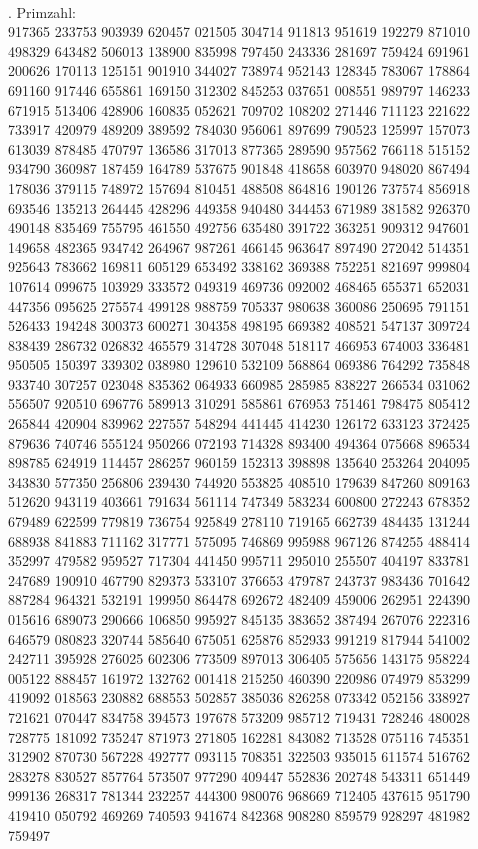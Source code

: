 \\
. Primzahl: \\
917365 233753 903939 620457 021505 304714 911813 951619 192279 871010 498329 643482 506013 138900 835998 797450 243336 281697 759424 691961 200626 170113 125151 901910 344027 738974 952143 128345 783067 178864 691160 917446 655861 169150 312302 845253 037651 008551 989797 146233 671915 513406 428906 160835 052621 709702 108202 271446 711123 221622 733917 420979 489209 389592 784030 956061 897699 790523 125997 157073 613039 878485 470797 136586 317013 877365 289590 957562 766118 515152 934790 360987 187459 164789 537675 901848 418658 603970 948020 867494 178036 379115 748972 157694 810451 488508 864816 190126 737574 856918 693546 135213 264445 428296 449358 940480 344453 671989 381582 926370 490148 835469 755795 461550 492756 635480 391722 363251 909312 947601 149658 482365 934742 264967 987261 466145 963647 897490 272042 514351 925643 783662 169811 605129 653492 338162 369388 752251 821697 999804 107614 099675 103929 333572 049319 469736 092002 468465 655371 652031 447356 095625 275574 499128 988759 705337 980638 360086 250695 791151 526433 194248 300373 600271 304358 498195 669382 408521 547137 309724 838439 286732 026832 465579 314728 307048 518117 466953 674003 336481 950505 150397 339302 038980 129610 532109 568864 069386 764292 735848 933740 307257 023048 835362 064933 660985 285985 838227 266534 031062 556507 920510 696776 589913 310291 585861 676953 751461 798475 805412 265844 420904 839962 227557 548294 441445 414230 126172 633123 372425 879636 740746 555124 950266 072193 714328 893400 494364 075668 896534 898785 624919 114457 286257 960159 152313 398898 135640 253264 204095 343830 577350 256806 239430 744920 553825 408510 179639 847260 809163 512620 943119 403661 791634 561114 747349 583234 600800 272243 678352 679489 622599 779819 736754 925849 278110 719165 662739 484435 131244 688938 841883 711162 317771 575095 746869 995988 967126 874255 488414 352997 479582 959527 717304 441450 995711 295010 255507 404197 833781 247689 190910 467790 829373 533107 376653 479787 243737 983436 701642 887284 964321 532191 199950 864478 692672 482409 459006 262951 224390 015616 689073 290666 106850 995927 845135 383652 387494 267076 222316 646579 080823 320744 585640 675051 625876 852933 991219 817944 541002 242711 395928 276025 602306 773509 897013 306405 575656 143175 958224 005122 888457 161972 132762 001418 215250 460390 220986 074979 853299 419092 018563 230882 688553 502857 385036 826258 073342 052156 338927 721621 070447 834758 394573 197678 573209 985712 719431 728246 480028 728775 181092 735247 871973 271805 162281 843082 713528 075116 745351 312902 870730 567228 492777 093115 708351 322503 935015 611574 516762 283278 830527 857764 573507 977290 409447 552836 202748 543311 651449 999136 268317 781344 232257 444300 980076 968669 712405 437615 951790 419410 050792 469269 740593 941674 842368 908280 859579 928297 481982 759497
\\
